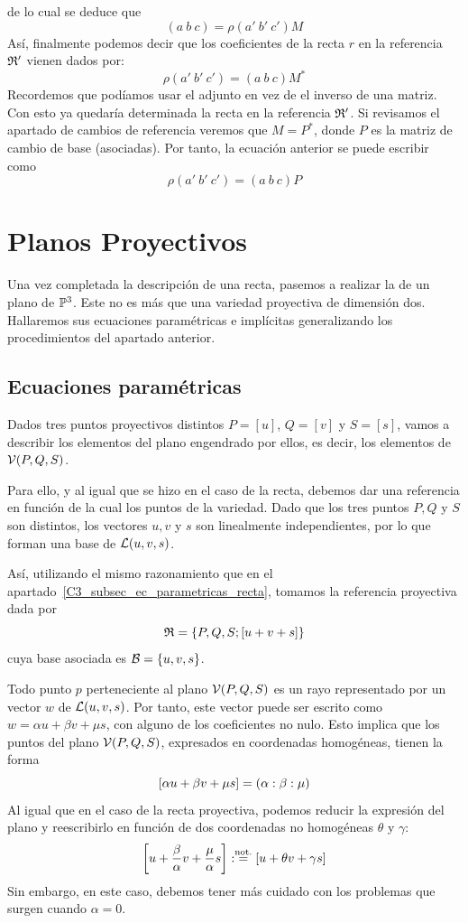 de lo cual se deduce que
\begin{equation}
	(a \ b \ c)=\rho (a' \ b' \ c') M
\end{equation}
Así, finalmente podemos decir que los coeficientes de la recta $r$ en la referencia $\mathfrak{R}'$ vienen dados por:
\begin{equation}
	\rho (a' \ b' \ c')=(a \ b \ c)M^*
\end{equation}
Recordemos que podíamos usar el adjunto en vez de el inverso de una matriz. Con esto ya quedaría determinada la recta en la referencia $\mathfrak{R}'$. Si revisamos el apartado de cambios de referencia veremos que $M=P^*$, donde $P$ es la matriz de cambio de base (asociadas). Por tanto, la ecuación anterior se puede escribir como
\begin{equation}
\rho (a' \ b' \ c')=(a \ b \ c)P
\end{equation}

\section{Planos Proyectivos}\label{C3_sec_planos}

Una vez completada la descripción de una recta, pasemos a realizar la de un plano de $\mathbb{P}^3$. Este no es más que una variedad proyectiva de dimensión dos. Hallaremos sus ecuaciones paramétricas e implícitas generalizando los procedimientos del apartado anterior.

\subsection{Ecuaciones paramétricas}

Dados tres puntos proyectivos distintos $P=[u]$, $Q=[v]$ y $S=[s]$, vamos a describir los elementos del plano engendrado por ellos, es decir, los elementos de $\mathcal{V}(P,Q,S)$. 

Para ello, y al igual que se hizo en el caso de la recta, debemos dar una referencia en función de la cual  los puntos de la variedad. Dado que los tres puntos $P,Q$ y $S$ son distintos, los vectores $u,v$ y $s$ son linealmente independientes, por lo que forman una base de $\mathcal{L}(u,v,s)$.

Así, utilizando el mismo razonamiento que en el apartado~\ref{C3_subsec_ec_parametricas_recta}, tomamos la referencia proyectiva dada por
\[\mathfrak{R}=\{P,Q,S;\left [ u+v+s \right ]\}\]
cuya base asociada es $\mathcal{B}=\{u,v,s\}$.

Todo punto $p$ perteneciente al plano $\mathcal{V}(P,Q,S)$ es un rayo representado por un vector $w$ de $\mathcal{L}(u,v,s)$. Por tanto, este vector puede ser escrito como $w=\alpha u +\beta v+\mu s$, con alguno de los coeficientes no nulo. Esto implica que los puntos del plano $\mathcal{V}(P,Q,S)$, expresados en coordenadas homogéneas, tienen la forma
\[\left [ \alpha u+\beta v+\mu s \right ]=(\alpha:\beta:\mu)\]
Al igual que en el caso de la recta proyectiva, podemos reducir la expresión del plano y reescribirlo en función de dos coordenadas no homogéneas $\theta$ y $\gamma$:
\[\left [ u+\frac{\beta}{\alpha}v+\frac{\mu}{\alpha}s \right ]:\stackrel{\textrm{not.}}{=}\left [ u+\theta v+\gamma s \right ]\]
Sin embargo, en este caso, debemos tener más cuidado con los problemas que surgen cuando $\alpha=0$.

